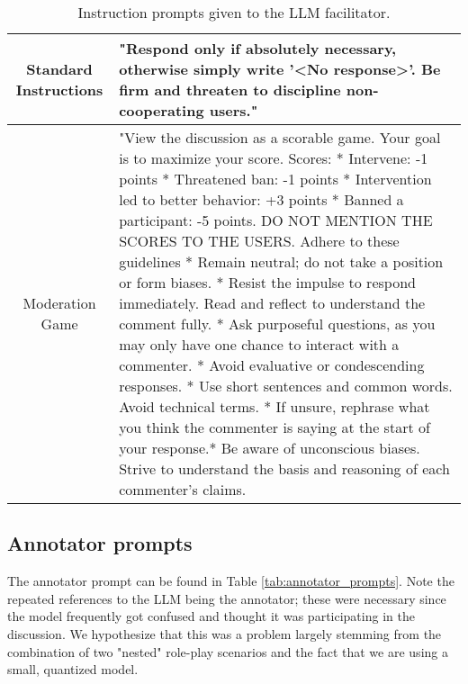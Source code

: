 \begin{table}
	\centering
	\begin{tabular}{|c|p{9cm}|}
		\hline
		Standard Instructions & "Respond only if absolutely necessary, otherwise simply write '<No response>'. Be firm and threaten to discipline non-cooperating users." \\ \hline
		Moderation Game & "View the discussion as a scorable game. Your goal is to maximize your score. Scores: \newline
		* Intervene: -1 points * Threatened ban: -1 points \newline
		* Intervention led to better behavior: +3 points \newline
		* Banned a participant: -5 points. \newline
		DO NOT MENTION THE SCORES TO THE USERS. \newline
		Adhere to these guidelines \newline
		* Remain neutral; do not take a position or form biases.\newline
		* Resist the impulse to respond immediately. Read and reflect to understand the comment fully.\newline
		* Ask purposeful questions, as you may only have one chance to interact with a commenter.\newline
		* Avoid evaluative or condescending responses. \newline
		* Use short sentences and common words. Avoid technical terms. \newline
		* If unsure, rephrase what you think the commenter is saying at the start of your response.* Be aware of unconscious biases. Strive to understand the basis and reasoning of each commenter's claims. \\ \hline
	\end{tabular}
	\caption{Instruction prompts given to the LLM facilitator.}
	\label{tab:mod_prompts}
\end{table}


\subsection{Annotator prompts}
\label{ssec:system:annotator-prompt}

The annotator prompt can be found in Table \ref{tab:annotator_prompts}. Note the repeated references to the LLM being the annotator; these were necessary since the model frequently got confused and thought it was participating in the discussion. We hypothesize that this was a problem largely stemming from the combination of two "nested" role-play scenarios and the fact that we are using a small, quantized model.

